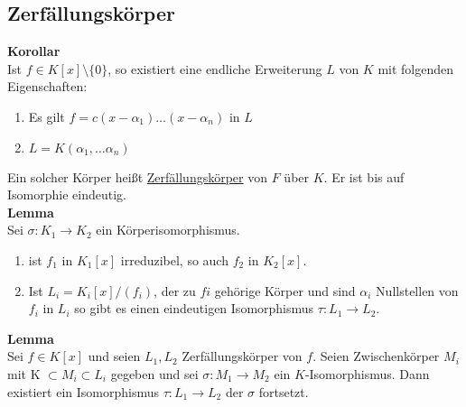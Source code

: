 \documentclass[a4paper, 12pt]{article}
\begin{document}
\subsection{Zerfällungskörper}
\textbf{Korollar}\\
Ist $f \in K[x]\setminus\{0\}$, so existiert eine endliche Erweiterung $L$ von $K$ mit folgenden Eigenschaften: \begin{enumerate}
	\item Es gilt $f = c(x-\alpha_1)\dots (x-\alpha_n)$ in $L$
	\item $L = K(\alpha_1,\dots \alpha_n)$
\end{enumerate}
Ein solcher Körper heißt \underline{Zerfällungskörper} von $F$ über $K$. Er ist bis auf Isomorphie eindeutig.\\
\textbf{Lemma}\\
Sei $\sigma: K_1 \to K_2$ ein Körperisomorphismus. \begin{enumerate}
	\item ist $f_1$ in $K_1[x]$ irreduzibel, so auch $f_2$ in $K_2[x]$.
	\item Ist $L_i = K_i[x]/(f_i)$, der zu $fi$ gehörige Körper und sind $\alpha_i$ Nullstellen von $f_i$ in $L_i$ so gibt es einen eindeutigen Isomorphismus $\tau: L_1 \to L_2$.
\end{enumerate} 
\textbf{Lemma}\\
Sei $f \in K[x]$ und seien $L_1, L_2$ Zerfällungskörper von $f$. Seien Zwischenkörper $M_i$ mit K $\subset M_i \subset L_i$ gegeben und sei $\sigma: M_1 \to M_2$ ein $K$-Isomorphismus. Dann existiert ein Isomorphismus $\tau: L_1 \to L_2$ der $\sigma$ fortsetzt.
\end{document}
